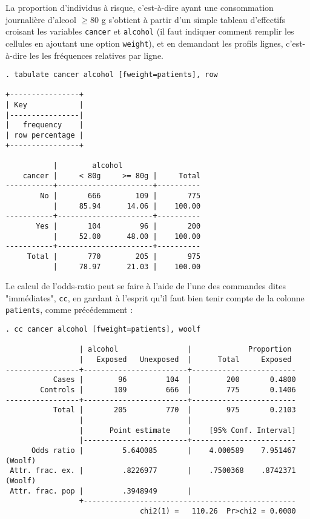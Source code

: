 La proportion d'individus à risque, c'est-à-dire ayant une consommation
journalière d'alcool $\ge 80$ g s'obtient à partir d'un simple tableau
d'effectifs croisant les variables \texttt{cancer} et \texttt{alcohol} (il
faut indiquer comment remplir les cellules en ajoutant une option
\texttt{weight}), et en demandant les profils lignes, c'est-à-dire les les
fréquences relatives par ligne.
\begin{verbatim}
. tabulate cancer alcohol [fweight=patients], row

+----------------+
| Key            |
|----------------|
|   frequency    |
| row percentage |
+----------------+

           |        alcohol
    cancer |     < 80g     >= 80g |     Total
-----------+----------------------+----------
        No |       666        109 |       775 
           |     85.94      14.06 |    100.00 
-----------+----------------------+----------
       Yes |       104         96 |       200 
           |     52.00      48.00 |    100.00 
-----------+----------------------+----------
     Total |       770        205 |       975 
           |     78.97      21.03 |    100.00
\end{verbatim}

Le calcul de l'odds-ratio peut se faire à l'aide de l'une des commandes
\Stata dites "immédiates", \texttt{cc}, en gardant à l'esprit qu'il faut bien
tenir compte de la colonne \texttt{patients}, comme précédemment :
\begin{verbatim}
. cc cancer alcohol [fweight=patients], woolf

                 | alcohol                |             Proportion
                 |   Exposed   Unexposed  |      Total     Exposed
-----------------+------------------------+------------------------
           Cases |        96         104  |        200       0.4800
        Controls |       109         666  |        775       0.1406
-----------------+------------------------+------------------------
           Total |       205         770  |        975       0.2103
                 |                        |
                 |      Point estimate    |    [95% Conf. Interval]
                 |------------------------+------------------------
      Odds ratio |         5.640085       |    4.000589    7.951467 (Woolf)
 Attr. frac. ex. |         .8226977       |    .7500368    .8742371 (Woolf)
 Attr. frac. pop |         .3948949       |
                 +-------------------------------------------------
                               chi2(1) =   110.26  Pr>chi2 = 0.0000
\end{verbatim}

